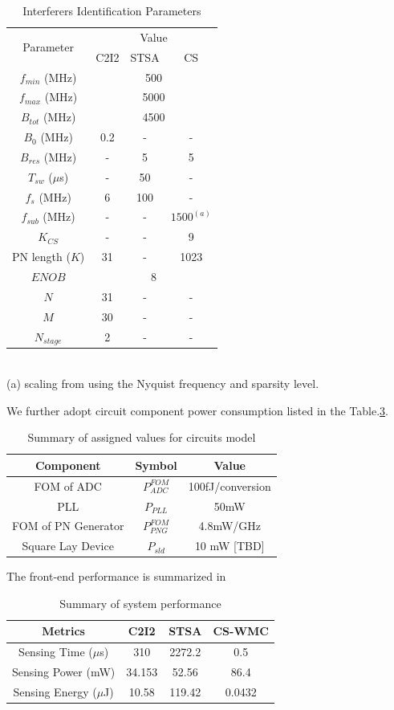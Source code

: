 \documentclass{IEEEtran}
\begin{document}
\begin{table}[ph]
\caption{Interferers Identification Parameters}
\centering
\begin{tabular}{c|c|c|c}
\hline
\multirow{2}{*}{Parameter} & \multicolumn{3}{c}{Value}\\
\hhline{~---}
&C2I2 & STSA & CS
\tabularnewline
\hline 
\hline 
$f_{min}$ (MHz)& \multicolumn{3}{c}{ 500}\tabularnewline
\hline 
$f_{max}$ (MHz)& \multicolumn{3}{c}{ 5000}\tabularnewline
\hline 
$B_{tot}$ (MHz) & \multicolumn{3}{c}{4500}\tabularnewline
\hline 
$B_0$ (MHz) & 0.2 & - & - \tabularnewline
\hline 
$B_{res}$ (MHz) & - & 5 & 5  \tabularnewline
\hline 
$T_{sw}$ ($\mu$s) & - & 50 \cite{5936264}& - \tabularnewline
\hline
$f_{s}$ (MHz) & 6 & 100 & - \tabularnewline
\hline
$f_{sub}$ (MHz) & - & - & $1500^{(a)}$ \tabularnewline
\hline
$K_{CS}$ & - & - & 9 \tabularnewline
\hline
PN length ($K$)& 31 & - & 1023 \tabularnewline
\hline
$ENOB$ &  \multicolumn{3}{c}{8} \tabularnewline
\hline
$N$ & 31 & - & - \tabularnewline
\hline
$M$ & 30 & - & - \tabularnewline
\hline
$N_{stage}$ &  2 & - & - \tabularnewline
\hline
\hline
\end{tabular}\\
(a) scaling from \cite{5678599} using the Nyquist frequency and sparsity level.
\label{tab:system_comparison_parameters}
\end{table}

We further adopt circuit component power consumption listed in the Table.\ref{tab:circuit_components}.

\begin{table}
\caption{Summary of assigned values for circuits model}
\centering
\begin{tabular}{c|c|c}
\hline 
Component & Symbol & Value\tabularnewline
\hline 
\hline 
FOM of ADC & $P^{FOM}_{ADC}$ & 100fJ/conversion \cite{6471261}\tabularnewline
 \hline 
PLL & $P_{PLL}$ & 50mW \cite{5453308} \tabularnewline
\hline
FOM of PN Generator & $P_{PNG}^{FOM}$ & 4.8mW/GHz \cite{5678599}\tabularnewline
 \hline
Square Lay Device & $P_{sld}$ & 10 mW [TBD]\tabularnewline
\hline 
\end{tabular}
\label{tab:circuit_components}
\end{table}

The front-end performance is summarized in 
\begin{table}
\caption{Summary of system performance}
\centering
\begin{tabular}{c|c|c|c}
\hline 
Metrics & C2I2 & STSA & CS-WMC \tabularnewline
\hline 
\hline 
Sensing Time ($\mu$s) & 310 & 2272.2 & 0.5  \tabularnewline
\hline 
Sensing Power (mW) & 34.153 & 52.56 & 86.4\tabularnewline
\hline 
Sensing Energy ($\mu$J) & 10.58 & 119.42 & 0.0432 \tabularnewline
\hline 
\end{tabular}
\label{tab:circuit_components}
\end{table}
\end{document}
